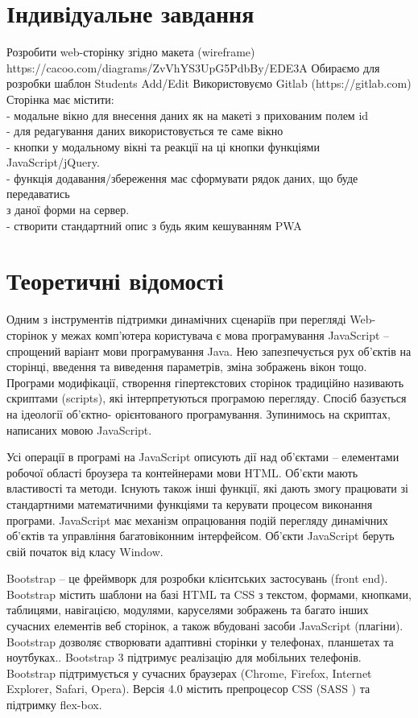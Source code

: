 \documentclass{article}
\begin{document}
\begin{normalsize}
\section*{Індивідуальне завдання}
Розробити web-сторінку згідно макета (wireframe)
https://cacoo.com/diagrams/ZvVhYS3UpG5PdbBy/EDE3A
Обираємо для розробки шаблон Students Add/Edit
Використовуємо Gitlab (https://gitlab.com)
Сторінка має містити:\\
- модальне вікно для внесення даних як на макеті з прихованим полем id\\
- для редагування даних використовується те саме вікно\\
- кнопки у модальному вікні та реакції на ці кнопки функціями JavaScript/jQuery.\\
- функція додавання/збереження має сформувати рядок даних, що буде передаватись\\
з даної форми на сервер.\\
- створити стандартний опис з будь яким кешуванням PWA

\section*{Теоретичні відомості}
Одним з інструментів підтримки динамічних сценаріїв при перегляді Web-сторінок у
межах комп’ютера користувача є мова програмування JavaScript – спрощений
варіант мови програмування Java. Нею запезпечується рух об’єктів на сторінці,
введення та виведення параметрів, зміна зображень вікон тощо. Програми модифікації,
створення гіпертекстових сторінок традиційно називають скриптами (scripts), які
інтерпретуються програмою перегляду. Спосіб базується на ідеології об’єктно-
орієнтованого програмування. Зупинимось на скриптах, написаних мовою JavaScript.

Усі операції в програмі на JavaScript описують дії над об’єктами – елементами
робочої області броузера та контейнерами мови HTML. Об’єкти мають властивості та
методи. Існують також інші функції, які дають змогу працювати зі стандартними
математичними функціями та керувати процесом виконання програми. JavaScript має
механізм опрацювання подій перегляду динамічних об’єктів та управління
багатовіконним інтерфейсом. Об’єкти JavaScript беруть свій початок від класу
Window.

Bootstrap – це фреймворк для розробки клієнтських застосувань (front end). Bootstrap
містить шаблони на базі HTML та CSS з текстом, формами, кнопками, таблицями,
навігацією, модулями, каруселями зображень та багато інших сучасних елементів веб
сторінок, а також вбудовані засоби JavaScript (плагіни). Bootstrap дозволяє створювати
адаптивні сторінки у телефонах, планшетах та ноутбуках.. Bootstrap 3 підтримує
реалізацію для мобільних телефонів. Bootstrap підтримується у сучасних браузерах
(Chrome, Firefox, Internet Explorer, Safari, Opera). Версія 4.0 містить препроцесор CSS
(SASS ) та підтримку flex-box.


\end{normalsize}
\end{document}
